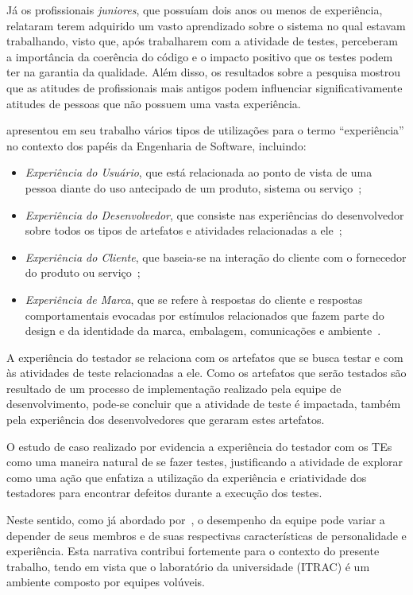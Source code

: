 Já os profissionais \textit{juniores}, que possuíam dois anos ou menos de experiência, relataram terem adquirido um vasto aprendizado sobre o sistema no qual estavam trabalhando, visto que, após trabalharem com a atividade de testes, perceberam a importância da coerência do código e o impacto positivo que os testes podem ter na garantia da qualidade. Além disso, os resultados sobre a pesquisa mostrou que as atitudes de profissionais mais antigos podem influenciar significativamente atitudes de pessoas que não possuem uma vasta experiência. 

\cite{ekwoge2017tester} apresentou em seu trabalho vários tipos de utilizações para o termo ``experiência'' no contexto dos papéis da Engenharia de Software, incluindo: 

\begin{itemize}
    \item  \textit{Experiência do Usuário}, que está relacionada ao ponto de vista de uma pessoa diante do uso antecipado de um produto, sistema ou serviço~\cite{hassenzahl2008user};
    \item  \textit{Experiência do Desenvolvedor}, que consiste nas experiências do desenvolvedor sobre todos os tipos de artefatos e atividades relacionadas a ele~\cite{fagerholm2012developer};
    \item  \textit{Experiência do Cliente}, que baseia-se na interação do cliente com o fornecedor do produto ou serviço~\cite{palmer2010customer};
    \item \textit{Experiência de Marca}, que se refere à respostas do cliente e respostas comportamentais evocadas por estímulos relacionados que fazem parte do design e da identidade da marca, embalagem, comunicações e ambiente~\cite{brakus2009brand}.
\end{itemize}

A experiência do testador se relaciona com os artefatos que se busca testar e com às atividades de teste relacionadas a ele. Como os artefatos que serão testados são resultado de um processo de implementação realizado pela equipe de desenvolvimento, pode-se concluir que a atividade de teste é impactada, também pela experiência dos desenvolvedores que geraram estes artefatos.

O estudo de caso realizado por \cite{itkonen2015test} evidencia a experiência do testador com os TEs como uma maneira natural de se fazer testes, justificando a atividade de explorar como uma ação que enfatiza a utilização da experiência e criatividade dos testadores para encontrar defeitos durante a execução dos testes. 

Neste sentido, como já abordado por~\cite{cruz2011personality}, o desempenho da equipe pode variar a depender de seus membros e de suas respectivas características de personalidade e experiência. Esta narrativa contribui fortemente para o contexto do presente trabalho, tendo em vista que o laboratório da universidade (ITRAC) é um ambiente composto por equipes volúveis.



